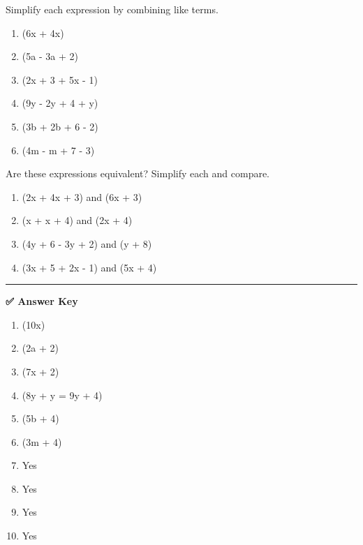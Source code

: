 \documentclass[
  letterpaper,
  DIV=11,
  numbers=noendperiod]{scrreprt}
\providecommand{\tightlist}{%
  \setlength{\itemsep}{0pt}\setlength{\parskip}{0pt}}
\begin{document}

Simplify each expression by combining like terms.

\begin{enumerate}
\def\labelenumi{\arabic{enumi}.}
\tightlist
\item
  (6x + 4x)\\
\item
  (5a - 3a + 2)\\
\item
  (2x + 3 + 5x - 1)\\
\item
  (9y - 2y + 4 + y)\\
\item
  (3b + 2b + 6 - 2)\\
\item
  (4m - m + 7 - 3)
\end{enumerate}

Are these expressions equivalent? Simplify each and compare.

\begin{enumerate}
\def\labelenumi{\arabic{enumi}.}
\setcounter{enumi}{6}
\tightlist
\item
  (2x + 4x + 3) and (6x + 3)\\
\item
  (x + x + 4) and (2x + 4)\\
\item
  (4y + 6 - 3y + 2) and (y + 8)\\
\item
  (3x + 5 + 2x - 1) and (5x + 4)
\end{enumerate}

\begin{center}\rule{0.5\linewidth}{0.5pt}\end{center}

\textbf{✅ Answer Key}

\begin{enumerate}
\def\labelenumi{\arabic{enumi}.}
\item
  (10x)\\
\item
  (2a + 2)\\
\item
  (7x + 2)\\
\item
  (8y + y = 9y + 4)\\
\item
  (5b + 4)\\
\item
  (3m + 4)
\item
  Yes\\
\item
  Yes\\
\item
  Yes\\
\item
  Yes\\
\end{enumerate}
\end{document}
